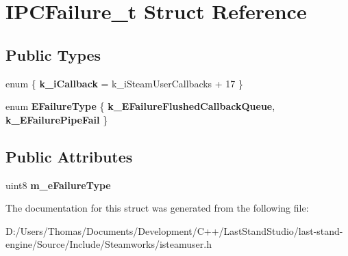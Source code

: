 \hypertarget{structIPCFailure__t}{}\section{I\+P\+C\+Failure\+\_\+t Struct Reference}
\label{structIPCFailure__t}
\subsection*{Public Types}
\begin{DoxyCompactItemize}
\item 
\hypertarget{structIPCFailure__t_aa698da6863ae35bd5730d46469287c73}{}enum \{ {\bfseries k\+\_\+i\+Callback} = k\+\_\+i\+Steam\+User\+Callbacks + 17
 \}\label{structIPCFailure__t_aa698da6863ae35bd5730d46469287c73}

\item 
\hypertarget{structIPCFailure__t_afc8deaf00f819b1527a7ab4e557a1513}{}enum {\bfseries E\+Failure\+Type} \{ {\bfseries k\+\_\+\+E\+Failure\+Flushed\+Callback\+Queue}, 
{\bfseries k\+\_\+\+E\+Failure\+Pipe\+Fail}
 \}\label{structIPCFailure__t_afc8deaf00f819b1527a7ab4e557a1513}

\end{DoxyCompactItemize}
\subsection*{Public Attributes}
\begin{DoxyCompactItemize}
\item 
\hypertarget{structIPCFailure__t_adc2e58d1387153ff30dfd42f5fffbf44}{}uint8 {\bfseries m\+\_\+e\+Failure\+Type}\label{structIPCFailure__t_adc2e58d1387153ff30dfd42f5fffbf44}

\end{DoxyCompactItemize}


The documentation for this struct was generated from the following file\+:\begin{DoxyCompactItemize}
\item 
D\+:/\+Users/\+Thomas/\+Documents/\+Development/\+C++/\+Last\+Stand\+Studio/last-\/stand-\/engine/\+Source/\+Include/\+Steamworks/isteamuser.\+h\end{DoxyCompactItemize}

